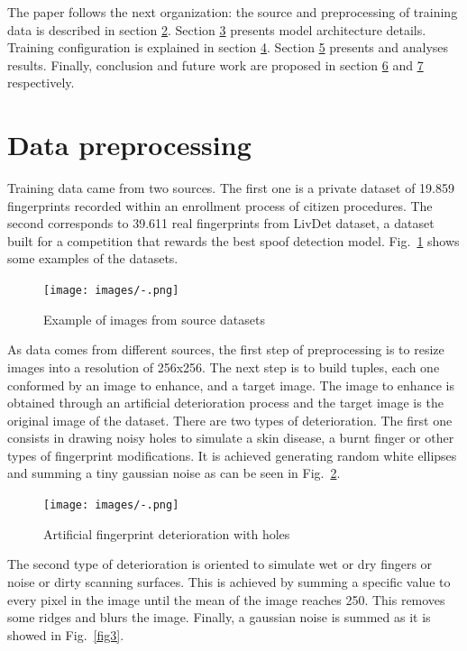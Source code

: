 \documentclass[a4paper,fleqn]{cas-dc}
\begin{document}
The paper follows the next organization: the source and preprocessing of training data is described in section \hyperref[sec:DP]{2}. Section \hyperref[sec:MA]{3} presents model architecture details. Training configuration is explained in section \hyperref[sec:MT]{4}. Section \hyperref[sec:R]{5} presents and analyses results. Finally, conclusion and future work are proposed in section \hyperref[sec:FW]{6} and \hyperref[sec:FW]{7} respectively.
     
\section{Data preprocessing}
\label{sec:DP}

Training data came from two sources. The first one is a private dataset of 19.859 fingerprints recorded within an enrollment process of citizen procedures. The second corresponds to 39.611 real fingerprints from LivDet dataset, a dataset built for a competition that rewards the best spoof detection model. Fig.~\ref{fig1} shows some examples of the datasets. 

\begin{figure}[htbp]
\centerline{\texttt{[image: images/-.png]}}
\caption{Example of images from source datasets}
\label{fig1}
\end{figure}

As data comes from different sources, the first step of preprocessing is to resize images into a resolution of 256x256. The next step is to build tuples, each one conformed by an image to enhance, and a target image. The image to enhance is obtained through an artificial deterioration process and the target image is the original image of the dataset. There are two types of deterioration. The first one consists in drawing noisy holes to simulate a skin disease, a burnt finger or other types of fingerprint modifications. It is achieved generating random white ellipses and summing a tiny gaussian noise as can be seen in Fig.~\ref{fig2}.

\begin{figure}[htbp]
\centerline{\texttt{[image: images/-.png]}}
\caption{Artificial fingerprint deterioration with holes}
\label{fig2}
\end{figure}

The second type of deterioration is oriented to simulate wet or dry fingers or noise or dirty scanning surfaces. This is achieved by summing a specific value to every pixel in the image until the mean of the image reaches 250. This removes some ridges and blurs the image. Finally, a gaussian noise is summed as it is showed in Fig.~\ref{fig3}.
\end{document}
